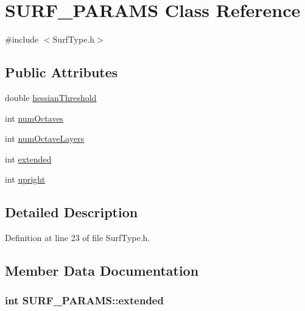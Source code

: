 \hypertarget{class_s_u_r_f___p_a_r_a_m_s}{
\section{\-S\-U\-R\-F\-\_\-\-P\-A\-R\-A\-M\-S \-Class \-Reference}
\label{class_s_u_r_f___p_a_r_a_m_s}
}


{\ttfamily \#include $<$\-Surf\-Type.\-h$>$}

\subsection*{\-Public \-Attributes}
\begin{DoxyCompactItemize}
\item 
double \hyperlink{class_s_u_r_f___p_a_r_a_m_s_a83a24513b75d2b36aeab2f4734e44882}{hessian\-Threshold}
\item 
int \hyperlink{class_s_u_r_f___p_a_r_a_m_s_a4c3319c48159907cd93e52f12c5d6610}{num\-Octaves}
\item 
int \hyperlink{class_s_u_r_f___p_a_r_a_m_s_acec977f220c8e2632f7bd5a9761765b3}{num\-Octave\-Layers}
\item 
int \hyperlink{class_s_u_r_f___p_a_r_a_m_s_aa4fbcc5ff94b76c6e7acf8eff5528f89}{extended}
\item 
int \hyperlink{class_s_u_r_f___p_a_r_a_m_s_af8ef2555b3dc9abbd8e151d60e420c7e}{upright}
\end{DoxyCompactItemize}


\subsection{\-Detailed \-Description}


\-Definition at line 23 of file \-Surf\-Type.\-h.



\subsection{\-Member \-Data \-Documentation}
\hypertarget{class_s_u_r_f___p_a_r_a_m_s_aa4fbcc5ff94b76c6e7acf8eff5528f89}{
\subsubsection[{extended}]{\setlength{\rightskip}{0pt plus 5cm}int {\bf \-S\-U\-R\-F\-\_\-\-P\-A\-R\-A\-M\-S\-::extended}}}
\label{class_s_u_r_f___p_a_r_a_m_s_aa4fbcc5ff94b76c6e7acf8eff5528f89}


